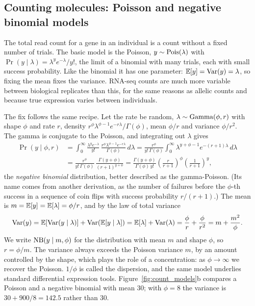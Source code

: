 \subsection{Counting molecules: Poisson and negative binomial models}

The total read count for a gene in an individual is a count without a fixed number of trials. The basic model is the Poisson, $y\sim\operatorname{Pois}(\lambda)$ with $\Pr(y\mid\lambda)=\lambda^ye^{-\lambda}/y!$, the limit of a binomial with many trials, each with small success probability. Like the binomial it has one parameter: $\mathbb{E}[y]=\operatorname{Var}(y)=\lambda$, so fixing the mean fixes the variance. RNA-seq counts are much more variable between biological replicates than this, for the same reasons as allelic counts and because true expression varies between individuals.

The fix follows the same recipe. Let the rate be random, $\lambda\sim\operatorname{Gamma}(\phi,r)$ with shape $\phi$ and rate $r$, density $r^\phi\lambda^{\phi-1}e^{-r\lambda}/\Gamma(\phi)$, mean $\phi/r$ and variance $\phi/r^2$. The gamma is conjugate to the Poisson, and integrating out $\lambda$ gives
\begin{align}
  \Pr(y\mid\phi,r) &= \int_0^\infty \frac{\lambda^ye^{-\lambda}}{y!}\,\frac{r^\phi\lambda^{\phi-1}e^{-r\lambda}}{\Gamma(\phi)}\,d\lambda
  = \frac{r^\phi}{y!\,\Gamma(\phi)}\int_0^\infty\lambda^{y+\phi-1}e^{-(r+1)\lambda}\,d\lambda \nonumber\\
  &= \frac{r^\phi}{y!\,\Gamma(\phi)}\,\frac{\Gamma(y+\phi)}{(r+1)^{y+\phi}}
  = \frac{\Gamma(y+\phi)}{\Gamma(\phi)\,y!}\left(\frac{r}{r+1}\right)^\phi\left(\frac{1}{r+1}\right)^y,
\end{align}
the \emph{negative binomial} distribution, better described as the gamma-Poisson. (Its name comes from another derivation, as the number of failures before the $\phi$-th success in a sequence of coin flips with success probability $r/(r+1)$.) The mean is $m=\mathbb{E}[y]=\mathbb{E}[\lambda]=\phi/r$, and by the law of total variance
\begin{equation}
  \operatorname{Var}(y) = \mathbb{E}[\operatorname{Var}(y\mid\lambda)]+\operatorname{Var}(\mathbb{E}[y\mid\lambda]) = \mathbb{E}[\lambda]+\operatorname{Var}(\lambda) = \frac{\phi}{r}+\frac{\phi}{r^2} = m + \frac{m^2}{\phi}.
\end{equation}
We write $\operatorname{NB}(y\mid m,\phi)$ for the distribution with mean $m$ and shape $\phi$, so $r=\phi/m$. The variance always exceeds the Poisson variance $m$, by an amount controlled by the shape, which plays the role of a concentration: as $\phi\to\infty$ we recover the Poisson. $1/\phi$ is called the dispersion, and the same model underlies standard differential expression tools. Figure~\ref{fig:count_models}b compares a Poisson and a negative binomial with mean 30; with $\phi=8$ the variance is $30+900/8=142.5$ rather than 30.

